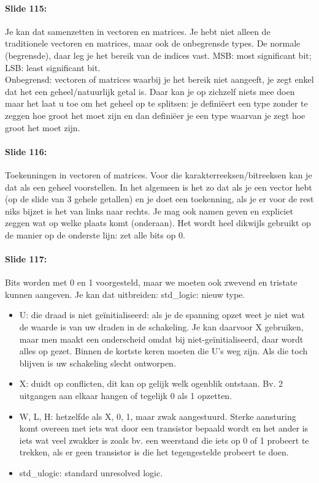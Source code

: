 \documentclass[10pt,a4paper]{book}
\begin{document}
\paragraph{Slide 115:} Je kan dat samenzetten in vectoren en matrices. Je hebt niet alleen de traditionele vectoren en matrices, maar ook de onbegrensde types. De normale (begrensde), daar leg je het bereik van de indices vast. MSB: most significant bit; LSB: least significant bit.\\
Onbegrensd: vectoren of matrices waarbij je het bereik niet aangeeft, je zegt enkel dat het een geheel/natuurlijk getal is. Daar kan je op zichzelf niets mee doen maar het laat u toe om het geheel op te splitsen: je defini\"eert een type zonder te zeggen hoe groot het moet zijn en dan defini\"eer je een type waarvan je zegt hoe groot het moet zijn.

\paragraph{Slide 116:} Toekenningen in vectoren of matrices. Voor die karakterreeksen/bitreeksen kan je dat als een geheel voorstellen. In het algemeen is het zo dat als je een vector hebt (op de slide van 3 gehele getallen) en je doet een toekenning, als je er voor de rest niks bijzet is het van links naar rechts. Je mag ook namen geven en expliciet zeggen wat op welke plaats komt (onderaan). Het wordt heel dikwijls gebruikt op de manier op de onderste lijn: zet alle bits op 0. 

\paragraph{Slide 117:} Bits worden met 0 en 1 voorgesteld, maar we moeten ook zwevend en tristate kunnen aangeven. Je kan dat uitbreiden: std\_logic: nieuw type.
\begin{itemize}
\item U: die draad is niet ge\"initialiseerd: als je de spanning opzet weet je niet wat de waarde is van uw draden in de schakeling. Je kan daarvoor X gebruiken, maar men maakt een onderscheid omdat bij niet-ge\"initialiseerd, daar wordt alles op gezet. Binnen de kortste keren moeten die U's weg zijn. Als die toch blijven is uw schakeling slecht ontworpen.	
\item X: duidt op conflicten, dit kan op gelijk welk ogenblik ontstaan. Bv. 2 uitgangen aan elkaar hangen of tegelijk 0 als 1 opzetten. 	
\item W, L, H: hetzelfde als X, 0, 1, maar zwak aangestuurd. Sterke aansturing komt overeen met iets wat door een transistor bepaald wordt en het ander is iets wat veel zwakker is zoals bv. een weerstand die iets op 0 of 1 probeert te trekken, als er geen transistor is die het tegengestelde probeert te doen.	
\item std\_ulogic: standard unresolved logic.
\end{itemize}
\end{document}
